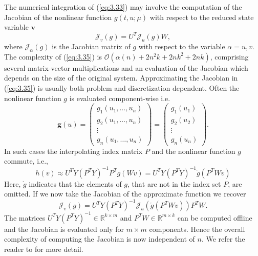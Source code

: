 The numerical integration of (\ref{eq:3.33}) may involve the computation of the Jacobian of the nonlinear function $g(t, u; \mu)$ with respect to the reduced state variable $\mathbf v$
\begin{equation} \label{eq:3.35}
	\mathcal J_{ v}(g) = U^T \mathcal J_{u} (g) W,
\end{equation}
where $\mathcal J_\alpha(g)$ is the Jacobian matrix of $g$ with respect to the variable $\alpha = u,v$. The complexity of (\ref{eq:3.35}) is $\mathcal{O}(\alpha(n) +2n^2k+2nk^2+2nk)$, comprising several matrix-vector multiplications and an evaluation of the Jacobian which depends on the size of the original system. Approximating the Jacobian in (\ref{eq:3.35}) is usually both problem and discretization dependent. Often the nonlinear function $g$ is evaluated component-wise i.e.
\begin{equation} \label{eq:3.36}
	\mathbf g(u) =
	\begin{pmatrix}
		g_1(u_1,\dots,u_n) \\
		g_2(u_1,\dots,u_n) \\
		\vdots \\
		g_n(u_1,\dots,u_n)
	\end{pmatrix}
	=
	\begin{pmatrix}
		g_1(u_1) \\
		g_2(u_2) \\
		\vdots \\
		g_n(u_n)
	\end{pmatrix}.
\end{equation}
In such cases the interpolating index matrix $P$ and the nonlinear function $ g$ commute, i.e.,
\begin{equation} \label{eq:3.37}
	h (v) \approx U^T Y(P^TY)^{-1}P^T g(Wv) = U^T Y(P^TY)^{-1} \mathring g(P^TW v)
\end{equation}
Here, $\mathring g$ indicates that the elements of $g$, that are not in the index set $P$, are omitted. If we now take the Jacobian of the approximate function we recover
\begin{equation} \label{eq:3.38}
	\mathcal J_{v}(g) = U^T Y(P^TY)^{-1} \mathcal J_{u}( \mathring g(P^T W v) ) P^T W.
\end{equation}
The matrices $U^T Y(P^TY)^{-1} \in \mathbb R^{k\times m}$ and $P^TW \in \mathbb R^{m\times k}$ can be computed offline and the Jacobian is evaluated only for $m\times m$ components. Hence the overall complexity of computing the Jacobian is now independent of $n$. We refer the reader to \cite{doi:10.1137/090766498,barrault2004empirical,quarteroni2015reduced,hesthaven2015certified} for more detail.
